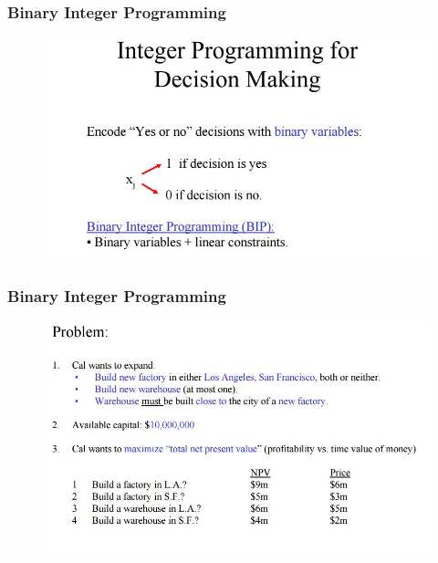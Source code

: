 \documentclass{beamer}
\begin{document}
\begin{frame}
\frametitle{Binary Integer Programming}
\large
\begin{figure}
\centering
\includegraphics[width=1.1\linewidth]{calaircraft1}
\end{figure}
\end{frame}
\begin{frame}
	\frametitle{Binary Integer Programming}
	\large
	\begin{figure}
		\centering
		\includegraphics[width=1.1\linewidth]{calaircraft2}
	\end{figure}
\end{frame}
\end{document}
